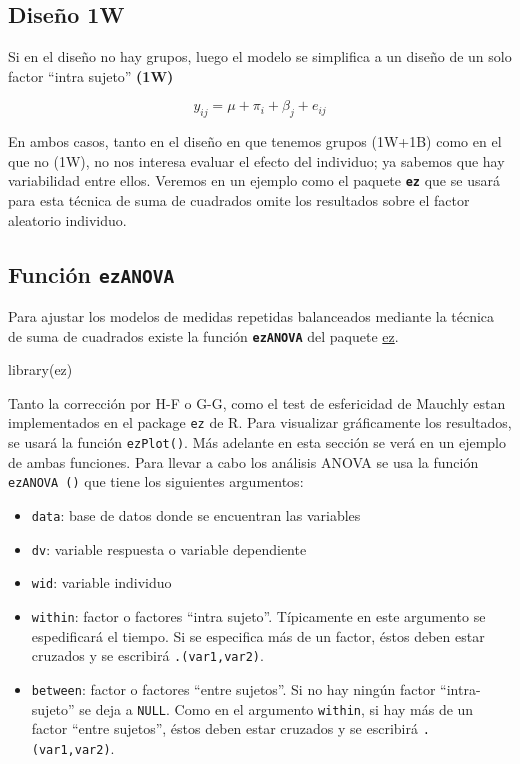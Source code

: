 \documentclass[
]{book}
\newenvironment{Shaded}{\begin{snugshade}}{\end{snugshade}}
\newcommand{\FunctionTok}[1]{\textcolor[rgb]{0.00,0.00,0.00}{#1}}
\newcommand{\NormalTok}[1]{#1}
\begin{document}
\hypertarget{diseuxf1o-1w}{%
\subsection{Diseño 1W}\label{diseuxf1o-1w}}

Si en el diseño no hay grupos, luego el modelo se simplifica a un diseño de un solo factor ``intra sujeto'' \textbf{(1W)}

\[y_{ij} = \mu + \pi_i + \beta_j + e_{ij}\]

En ambos casos, tanto en el diseño en que tenemos grupos (1W+1B) como en el que no (1W), no nos interesa evaluar el efecto del individuo; ya sabemos que hay variabilidad entre ellos. Veremos en un ejemplo como el paquete \textbf{\texttt{ez}} que se usará para esta técnica de suma de cuadrados omite los resultados sobre el factor aleatorio individuo.

\hypertarget{funciuxf3n-ezanova}{%
\subsection{\texorpdfstring{Función \texttt{ezANOVA}}{Función ezANOVA}}\label{funciuxf3n-ezanova}}

Para ajustar los modelos de medidas repetidas balanceados mediante la técnica de suma de cuadrados existe la función \textbf{\texttt{ezANOVA}} del paquete \href{https://github.com/mike-lawrence/ez}{ez}.

\begin{Shaded}
\begin{Highlighting}[]
\FunctionTok{library}\NormalTok{(ez)}
\end{Highlighting}
\end{Shaded}

Tanto la corrección por H-F o G-G, como el test de esfericidad de Mauchly estan implementados en el package \texttt{ez} de R. Para visualizar gráficamente los resultados, se usará la función \texttt{ezPlot()}. Más adelante en esta sección se verá en un ejemplo de ambas funciones. Para llevar a cabo los análisis ANOVA se usa la función \texttt{ezANOVA\ ()} que tiene los siguientes argumentos:

\begin{itemize}
\item
  \texttt{data}: base de datos donde se encuentran las variables
\item
  \texttt{dv}: variable respuesta o variable dependiente
\item
  \texttt{wid}: variable individuo
\item
  \texttt{within}: factor o factores ``intra sujeto''. Típicamente en este argumento se espedificará el tiempo. Si se especifica más de un factor, éstos deben estar cruzados y se escribirá \texttt{.(var1,var2)}.
\item
  \texttt{between}: factor o factores ``entre sujetos''. Si no hay ningún factor ``intra-sujeto'' se deja a \texttt{NULL}. Como en el argumento \texttt{within}, si hay más de un factor ``entre sujetos'', éstos deben estar cruzados y se escribirá \texttt{.(var1,var2)}.
\end{itemize}
\end{document}
